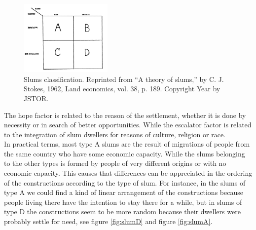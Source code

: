 \documentclass[10pt]{article}
\begin{document}
\begin{figure}[h]
    \centering
    \includegraphics[width=0.4\textwidth]{images/img}
    \caption{Slums classification. Reprinted from “A theory of slums,” by  C. J. Stokes, 1962, Land economics, vol. 38, p. 189. Copyright Year by JSTOR.}
    \label{fig:slums_classification}
\end{figure}

The hope factor is related to the reason of the settlement, whether it is done by necessity or in search of better opportunities. While the escalator factor is related to the integration of slum dwellers for reasons of culture, religion or race.\\

In practical terms, most type A slums are the result of migrations of people from the same country who have some economic capacity. While the slums belonging to the other types is formed by people of very different origins or with no economic capacity. This causes that differences can be appreciated in the ordering of the constructions according to the type of slum. For instance, in the slums of type A we could find a kind of linear arrangement of the constructions because people living there have the intention to stay there for a while, but in slums of type D the constructions seem to be more random because their dwellers were probably settle for need, see figure \ref{fig:slumD} and figure \ref{fig:slumA}.\\ \
\end{document}
